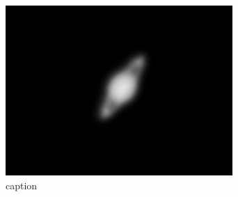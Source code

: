\documentclass[main]{subfiles}
\begin{document}
\begin{figure}[htbp]
    \centering
    \includegraphics[keepaspectratio, width=\linewidth]{figures/Saturn.jpg}
    \caption{caption}
    \label{fig:label}
\end{figure}
\end{document}
